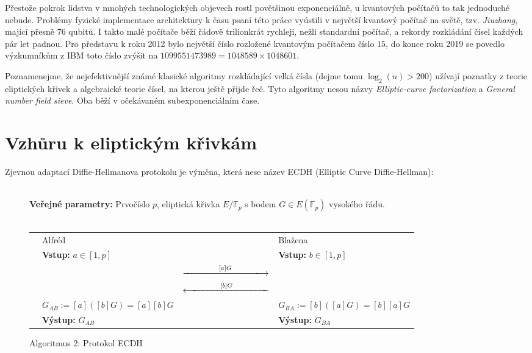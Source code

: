 \documentclass[12pt]{report}
\begin{document}
Přestože pokrok lidstva v mnohých technologických objevech rostl povětšinou exponenciálně, u kvantových počítačů to tak jednoduché nebude. Problémy fyzické implementace architektury k času psaní této práce vyústili v největší kvantový počítač na světě, tzv. \textit{Jiuzhang}, mající přesně $76$ qubitů. I takto malé počítače běží řádově trilionkrát rychleji, nežli standardní počítač, a rekordy rozkládání čísel každých pár let padnou. Pro představu k roku 2012 bylo největší číslo rozložené kvantovým počítačem číslo $15$, do konce roku 2019 se povedlo výzkumníkům z IBM \cite{Karamlou} toto číslo zvýšit na $1099551473989 = 1048589 \times 1048601$.

Poznamenejme, že nejefektivnější známé klasické algoritmy rozkládající velká čísla (dejme tomu $\log_2(n)>200$) užívají poznatky z teorie eliptických křivek a algebraické teorie čísel, na kterou ještě přijde řeč. Tyto algoritmy nesou názvy \textit{Elliptic-curve factorization} a \textit{General number field sieve}. Oba běží v očekávaném subexponenciálním čase.

\section{Vzhůru k eliptickým křivkám}


Zjevnou adaptací Diffie-Hellmanova protokolu je výměna, která nese název ECDH (Elliptic Curve Diffie-Hellman):
\begin{figure}[h]
\begin{center} 
\makebox[1cm]{\rule{17.3cm}{0.4pt}}\\
\hspace{-1.35cm} \textbf{Veřejné parametry:} Prvočíslo $p$, eliptická křivka $E/\mathbb{F}_p$ s bodem $G \in E(\mathbb{F}_p)$ vysokého řádu.\\

\vspace{-0.25cm}
\makebox[\linewidth]{\rule{17.3cm}{0.4pt}}\\
\vspace{0.2cm}
\begin{tabular}{l l c l}
\cline{2-2} \cline{4-4} 
& Alfréd & & Blažena \\ 
\cline{2-2} \cline{4-4} 
& \textbf{Vstup:} $a \in [1,p]$ & & \textbf{Vstup:} $b\in [1,p]$ \\
 & & $ \xlongrightarrow{\qquad \qquad  [a]G \qquad \qquad}$  &  \\
&  & $\xlongleftarrow{\qquad \qquad  [b]G \qquad \qquad}$   &  \\
& $G_{AB} := [a]([b]G) = [a][b]G$ &  & $ G_{BA} := [b]([a]G) = [b][a]G$ \\
& \textbf{Výstup:} $G_{AB}$ & & \textbf{Výstup:} $G_{BA}$
\end{tabular}
\caption*{Algoritmus 2: Protokol ECDH}

\end{center}
\end{figure}
\end{document}

